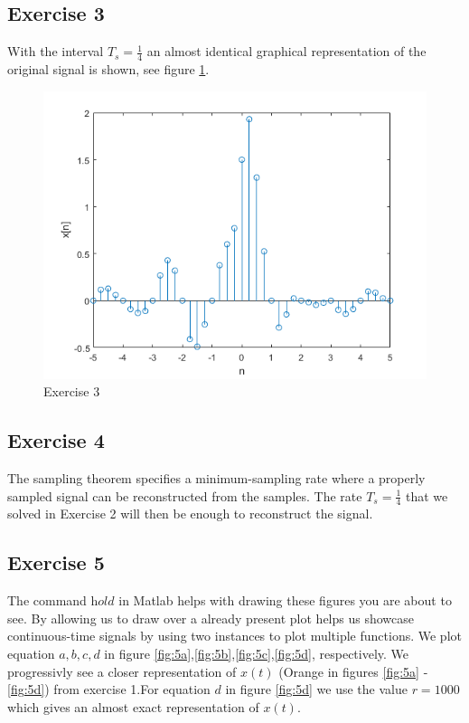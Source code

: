 \documentclass[a4paper]{article}
\begin{document}
\subsection{Exercise 3}
With the interval $T_s = \frac{1}{4}$ an almost identical graphical representation of the original signal is shown, see figure \ref{fig:3}.
\begin{figure}
    \centering
    \includegraphics{3.png}
    \caption{Exercise 3}
    \label{fig:3}
\end{figure}

\subsection{Exercise 4}
The sampling theorem specifies a minimum-sampling rate where a properly sampled signal can be reconstructed from the samples. The rate $T_s = \frac{1}{4}$ that we solved in Exercise 2 will then be enough to reconstruct the signal.

\subsection{Exercise 5}
The command $\textit{hold}$ in Matlab helps with drawing these figures you are about to see. By allowing us to draw over a already present plot helps us showcase continuous-time signals by using two instances to plot multiple functions.
We plot equation $a,b,c,d$ in figure \ref{fig:5a},\ref{fig:5b},\ref{fig:5c},\ref{fig:5d}, respectively. We progressivly see a closer representation of $x(t)$ (Orange in figures \ref{fig:5a} - \ref{fig:5d}) from exercise 1.For equation $d$ in figure \ref{fig:5d} we use the value $r = 1000$ which gives an almost exact representation of $x(t)$. \\
\end{document}
